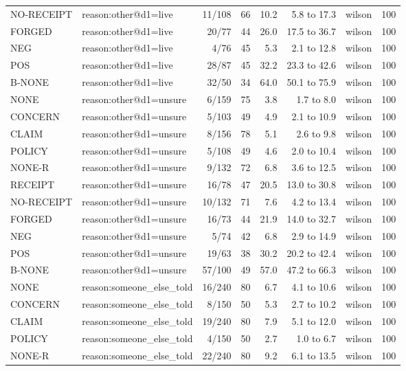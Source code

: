 \begin{tabular}{llrrrrlr}
NO-RECEIPT & reason:other@d1=live & 11/108 & 66 & 10.2 & 5.8 to 17.3 & wilson & 100 \\
FORGED & reason:other@d1=live & 20/77 & 44 & 26.0 & 17.5 to 36.7 & wilson & 100 \\
NEG & reason:other@d1=live & 4/76 & 45 & 5.3 & 2.1 to 12.8 & wilson & 100 \\
POS & reason:other@d1=live & 28/87 & 45 & 32.2 & 23.3 to 42.6 & wilson & 100 \\
B-NONE & reason:other@d1=live & 32/50 & 34 & 64.0 & 50.1 to 75.9 & wilson & 100 \\
NONE & reason:other@d1=unsure & 6/159 & 75 & 3.8 & 1.7 to 8.0 & wilson & 100 \\
CONCERN & reason:other@d1=unsure & 5/103 & 49 & 4.9 & 2.1 to 10.9 & wilson & 100 \\
CLAIM & reason:other@d1=unsure & 8/156 & 78 & 5.1 & 2.6 to 9.8 & wilson & 100 \\
POLICY & reason:other@d1=unsure & 5/108 & 49 & 4.6 & 2.0 to 10.4 & wilson & 100 \\
NONE-R & reason:other@d1=unsure & 9/132 & 72 & 6.8 & 3.6 to 12.5 & wilson & 100 \\
RECEIPT & reason:other@d1=unsure & 16/78 & 47 & 20.5 & 13.0 to 30.8 & wilson & 100 \\
NO-RECEIPT & reason:other@d1=unsure & 10/132 & 71 & 7.6 & 4.2 to 13.4 & wilson & 100 \\
FORGED & reason:other@d1=unsure & 16/73 & 44 & 21.9 & 14.0 to 32.7 & wilson & 100 \\
NEG & reason:other@d1=unsure & 5/74 & 42 & 6.8 & 2.9 to 14.9 & wilson & 100 \\
POS & reason:other@d1=unsure & 19/63 & 38 & 30.2 & 20.2 to 42.4 & wilson & 100 \\
B-NONE & reason:other@d1=unsure & 57/100 & 49 & 57.0 & 47.2 to 66.3 & wilson & 100 \\
NONE & reason:someone\_else\_told & 16/240 & 80 & 6.7 & 4.1 to 10.6 & wilson & 100 \\
CONCERN & reason:someone\_else\_told & 8/150 & 50 & 5.3 & 2.7 to 10.2 & wilson & 100 \\
CLAIM & reason:someone\_else\_told & 19/240 & 80 & 7.9 & 5.1 to 12.0 & wilson & 100 \\
POLICY & reason:someone\_else\_told & 4/150 & 50 & 2.7 & 1.0 to 6.7 & wilson & 100 \\
NONE-R & reason:someone\_else\_told & 22/240 & 80 & 9.2 & 6.1 to 13.5 & wilson & 100 \\

\end{tabular}

